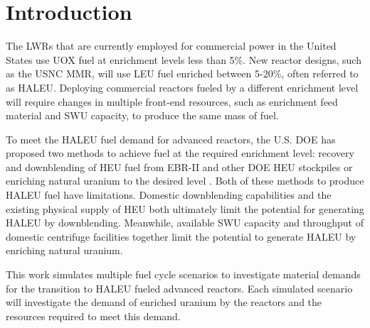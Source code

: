 \section{Introduction}
The \glspl{LWR} that are currently employed for commercial power in the 
United States use \gls{UOX} fuel at enrichment levels 
less than 5\%. New reactor designs, such as the \gls{USNC} \gls{MMR}, will 
use \gls{LEU} fuel enriched between 5-20\%, often referred to as \gls{HALEU}.
Deploying commercial reactors fueled by a different enrichment level 
will require 
changes in multiple front-end resources, such as enrichment 
feed material and \gls{SWU} capacity, to produce the same mass of fuel. 

To meet the \gls{HALEU} fuel demand for advanced reactors, the U.S. 
\gls{DOE} has proposed two methods to achieve fuel at the 
required enrichment level: recovery and downblending of \gls{HEU} fuel 
from EBR-II and other \gls{DOE} \gls{HEU} stockpiles or enriching natural 
uranium to the desired level \cite{griffith_overview_2020}. Both of these 
methods to produce \gls{HALEU} fuel have limitations. Domestic downblending 
capabilities and the existing physical supply of \gls{HEU} both ultimately 
limit the potential for generating \gls{HALEU} by downblending. Meanwhile, 
available \gls{SWU} capacity and throughput of domestic centrifuge 
facilities together limit the potential to generate \gls{HALEU} by 
enriching natural uranium. 

This work simulates multiple fuel cycle scenarios to investigate 
material demands for the transition to \gls{HALEU} fueled advanced 
reactors. Each simulated 
scenario will investigate the demand of enriched uranium by the 
reactors and the resources required to meet this demand. 